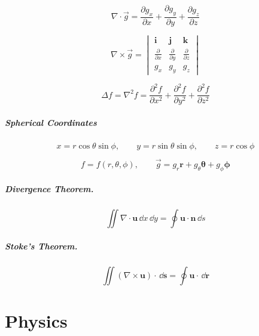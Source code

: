 \[
\nabla \cdot \vec{g} = \frac{\partial g_x}{\partial x} + \frac{\partial g_y}{\partial y}
+ \frac{\partial g_z}{\partial z}
\]

\[
\nabla \times \vec{g} =
\begin{vmatrix}
  \mathbf{i} & \mathbf{j} & \mathbf{k} \\
  \frac{\partial}{\partial x} & \frac{\partial}{\partial y} & \frac{\partial}{\partial z} \\
  g_x & g_y & g_z
\end{vmatrix}
\]

\[
\Delta f = \nabla^2 f = \frac{\partial^2 f}{\partial x^2} + \frac{\partial^2 f}{\partial y^2} + \frac{\partial^2 f}{\partial z^2}
\]


\paragraph{Spherical Coordinates}

\[
x = r \cos \theta \sin \phi, \qquad
y = r \sin \theta \sin \phi, \qquad
z = r \cos \phi
\]

\[
f = f(r, \theta, \phi), \qquad \vec{g} = 
g_r \mathbf{r} + g_\theta \boldsymbol{\theta} + g_\phi \boldsymbol{\phi}
\]








\paragraph{Divergence Theorem.}
\[
\iint \nabla \cdot \mathbf{u} \,\dd x \,\dd y 
= \oint \mathbf{u} \cdot \mathbf{n} \,\dd s
\]

\paragraph{Stoke's Theorem.}
\[
\iint (\nabla \times \mathbf{u}) \cdot \,\dd \mathbf{s}
= \oint \mathbf{u} \cdot \,\dd \mathbf{r}
\]







\raggedbottom
\chapter{Physics}
\label{chapter spherical chicken}
\flushbottom


